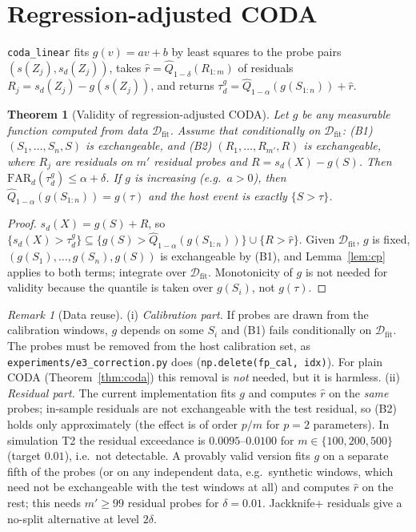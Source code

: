 \documentclass[conference]{IEEEtran}
\newtheorem{theorem}{Theorem}
\theoremstyle{definition}
\theoremstyle{remark}
\newtheorem{remark}{Remark}
\newcommand{\Q}{\widehat Q}
\newcommand{\FAR}{\mathrm{FAR}}
\begin{document}
\section{Regression-adjusted CODA}
\texttt{coda\_linear} fits $g(v)=av+b$ by least squares to the probe pairs $(s(Z_j),s_d(Z_j))$, takes $\hat r=\Q_{1-\delta}(R_{1:m})$ of residuals $R_j=s_d(Z_j)-g(s(Z_j))$, and returns $\tau^g_d=\Q_{1-\alpha}(g(S_{1:n}))+\hat r$.

\begin{theorem}[Validity of regression-adjusted CODA]\label{thm:lin}
Let $g$ be any measurable function computed from data $\mathcal D_{\mathrm{fit}}$. Assume that conditionally on $\mathcal D_{\mathrm{fit}}$: (B1) $(S_1,\dots,S_n,S)$ is exchangeable, and (B2) $(R_1,\dots,R_{m'},R)$ is exchangeable, where $R_j$ are residuals on $m'$ residual probes and $R=s_d(X)-g(S)$. Then $\FAR_d(\tau^g_d)\le\alpha+\delta$. If $g$ is increasing (e.g.\ $a>0$), then $\Q_{1-\alpha}(g(S_{1:n}))=g(\tau)$ and the host event is exactly $\{S>\tau\}$.
\end{theorem}
\begin{proof}
$s_d(X)=g(S)+R$, so $\{s_d(X)>\tau^g_d\}\subseteq\{g(S)>\Q_{1-\alpha}(g(S_{1:n}))\}\cup\{R>\hat r\}$. Given $\mathcal D_{\mathrm{fit}}$, $g$ is fixed, $(g(S_1),\dots,g(S_n),g(S))$ is exchangeable by (B1), and Lemma~\ref{lem:cp} applies to both terms; integrate over $\mathcal D_{\mathrm{fit}}$. Monotonicity of $g$ is not needed for validity because the quantile is taken over $g(S_i)$, not $g(\tau)$.
\end{proof}

\begin{remark}[Data reuse]
(i) \emph{Calibration part.} If probes are drawn from the calibration windows, $g$ depends on some $S_i$ and (B1) fails conditionally on $\mathcal D_{\mathrm{fit}}$. The probes must be removed from the host calibration set, as \texttt{experiments/e3\_correction.py} does (\texttt{np.delete(fp\_cal, idx)}). For plain CODA (Theorem~\ref{thm:coda}) this removal is \emph{not} needed, but it is harmless. (ii) \emph{Residual part.} The current implementation fits $g$ and computes $\hat r$ on the \emph{same} probes; in-sample residuals are not exchangeable with the test residual, so (B2) holds only approximately (the effect is of order $p/m$ for $p=2$ parameters). In simulation T2 the residual exceedance is $0.0095$--$0.0100$ for $m\in\{100,200,500\}$ (target $0.01$), i.e.\ not detectable. A provably valid version fits $g$ on a separate fifth of the probes (or on any independent data, e.g.\ synthetic windows, which need not be exchangeable with the test windows at all) and computes $\hat r$ on the rest; this needs $m'\ge 99$ residual probes for $\delta=0.01$. Jackknife+ residuals \cite{barber2021jackknife} give a no-split alternative at level $2\delta$.
\end{remark}
\end{document}
